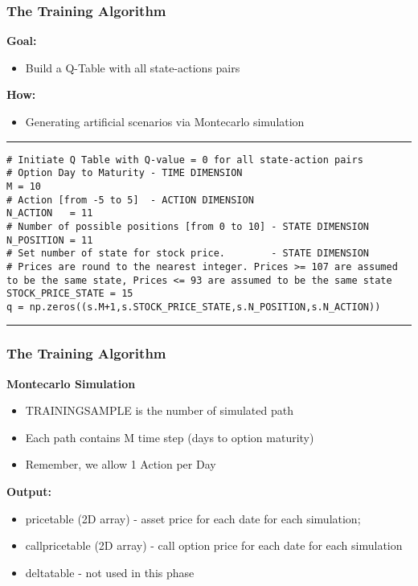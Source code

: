 \documentclass[11pt]{beamer}
\begin{document}
\begin{frame}[fragile]
\frametitle{The Training Algorithm}
\footnotesize
	\textbf{Goal:}
	\begin{itemize}
		\item Build a Q-Table with all state-actions pairs
	\end{itemize}
	\textbf{How:}
	\begin{itemize}
		\item Generating artificial scenarios via Montecarlo simulation
	\end{itemize}
\rule{\textwidth}{1pt}
\begin{verbatim}
# Initiate Q Table with Q-value = 0 for all state-action pairs
# Option Day to Maturity - TIME DIMENSION
M = 10
# Action [from -5 to 5]  - ACTION DIMENSION 
N_ACTION   = 11
# Number of possible positions [from 0 to 10] - STATE DIMENSION 
N_POSITION = 11
# Set number of state for stock price.        - STATE DIMENSION 
# Prices are round to the nearest integer. Prices >= 107 are assumed to be the same state, Prices <= 93 are assumed to be the same state
STOCK_PRICE_STATE = 15 
q = np.zeros((s.M+1,s.STOCK_PRICE_STATE,s.N_POSITION,s.N_ACTION))
\end{verbatim}
\rule{\textwidth}{1pt}

\end{frame}
\begin{frame}[fragile]
\frametitle{The Training Algorithm}
	\textbf{Montecarlo Simulation}
	\begin{itemize}
		\item  TRAINING\textunderscore SAMPLE is the number of simulated path
		\item  Each path contains M time step (days to option maturity)
		\item  Remember, we allow 1 Action per Day 
	\end{itemize}
	\textbf{Output:}	
	\begin{itemize}
		\item price\textunderscore table (2D array) - asset price for each date for each simulation;
		\item call\textunderscore price\textunderscore table (2D array) - call option price for each date for each simulation
		\item delta\textunderscore table - not used in this phase 
	\end{itemize}
\end{frame}
\end{document}
